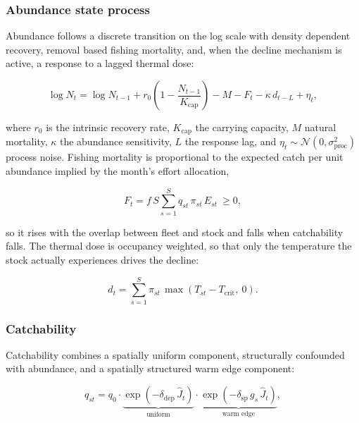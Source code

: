 \documentclass[
  11pt,
  a4paper,
]{article}
\begin{document}
\hypertarget{abundance-state-process}{%
\subsubsection{Abundance state process}\label{abundance-state-process}}

Abundance follows a discrete transition on the log scale with density
dependent recovery, removal based fishing mortality, and, when the
decline mechanism is active, a response to a lagged thermal dose:

\begin{equation}
\log N_t = \log N_{t-1} + r_0\!\left(1 - \frac{N_{t-1}}{K_{\text{cap}}}\right) - M - F_t - \kappa\,d_{t-L} + \eta_t,
\end{equation}

\noindent where \(r_0\) is the intrinsic recovery rate, \(K_{\text{cap}}\) the
carrying capacity, \(M\) natural mortality, \(\kappa\) the abundance
sensitivity, \(L\) the response lag, and
\(\eta_t \sim \mathcal{N}(0, \sigma_{\text{proc}}^2)\) process noise.
Fishing mortality is proportional to the expected catch per unit
abundance implied by the month's effort allocation,

\begin{equation}
F_t = f\,S\sum_{s=1}^{S} q_{st}\,\pi_{st}\,E_{st} \ \ge 0,
\end{equation}

\noindent so it rises with the overlap between fleet and stock and falls when
catchability falls. The thermal dose is occupancy weighted, so that only
the temperature the stock actually experiences drives the decline:

\begin{equation}
d_t = \sum_{s=1}^{S} \pi_{st}\,\max\!\left(T_{st} - T_{\text{crit}},\ 0\right).
\end{equation}

\hypertarget{catchability}{%
\subsubsection{Catchability}\label{catchability}}

Catchability combines a spatially uniform component, structurally
confounded with abundance, and a spatially structured warm edge
component:

\begin{equation}
q_{st} = q_0 \cdot \underbrace{\exp\!\left(-\delta_{\text{dep}}\,\hat{J}_t\right)}_{\text{uniform}} \cdot \underbrace{\exp\!\left(-\delta_{\text{sp}}\,g_s\,\hat{J}_t\right)}_{\text{warm edge}},
\end{equation}
\end{document}
